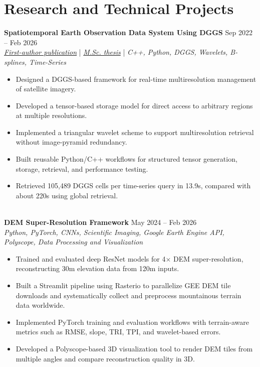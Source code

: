 \documentclass[a4paper,10pt]{article}
\begin{document}

\section*{Research and Technical Projects}

\noindent
\textbf{Spatiotemporal Earth Observation Data System Using DGGS} \hfill Sep 2022 -- Feb 2026 \\
\textit{\href{https://doi.org/10.3390/rs17040570}{First-author publication}} | \textit{\href{https://ucalgary.scholaris.ca/items/114b394b-e516-4732-bd3a-45dd6160d480}{M.Sc. thesis}} | \textit{C++, Python, DGGS, Wavelets, B-splines, Time-Series}
\begin{itemize}[leftmargin=0.25in]
    \item Designed a DGGS-based framework for real-time multiresolution management of satellite imagery.
    \item Developed a tensor-based storage model for direct access to arbitrary regions at multiple resolutions.
    \item Implemented a triangular wavelet scheme to support multiresolution retrieval without image-pyramid redundancy.
    \item Built reusable Python/C++ workflows for structured tensor generation, storage, retrieval, and performance testing.
    \item Retrieved 105,489 DGGS cells per time-series query in 13.9s, compared with about 220s using global retrieval.
\end{itemize}

\noindent \\
\textbf{DEM Super-Resolution Framework} \hfill May 2024 -- Feb 2026 \\
\textit{Python, PyTorch, CNNs, Scientific Imaging, Google Earth Engine API, Polyscope, Data Processing and Visualization}
\begin{itemize}[leftmargin=0.25in]
    \item Trained and evaluated deep ResNet models for 4$\times$ DEM super-resolution, reconstructing 30m elevation data from 120m inputs.
    \item Built a Streamlit pipeline using Rasterio to parallelize GEE DEM tile downloads and systematically collect and preprocess mountainous terrain data worldwide.
    \item Implemented PyTorch training and evaluation workflows with terrain-aware metrics such as RMSE, slope, TRI, TPI, and wavelet-based errors.
    \item Developed a Polyscope-based 3D visualization tool to render DEM tiles from multiple angles and compare reconstruction quality in 3D.
\end{itemize}
\end{document}

